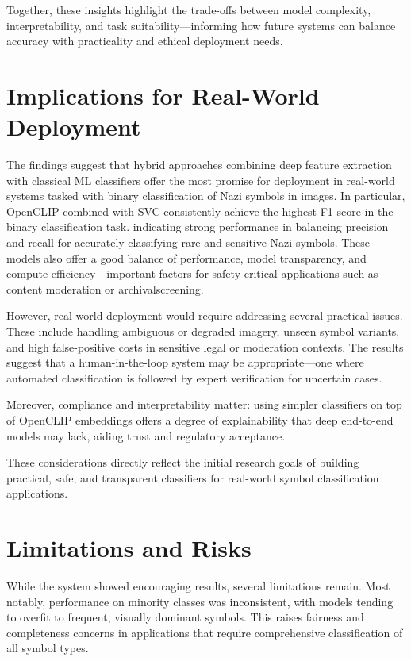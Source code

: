 Together, these insights highlight the trade-offs between model complexity, interpretability, and task
suitability—informing how future systems can balance accuracy with practicality and ethical deployment needs.

\section{Implications for Real-World Deployment}
\label{subsec:deployment-implications}

The findings suggest that hybrid approaches combining deep feature extraction with classical \ac{ML}
classifiers offer the most promise for deployment in real-world systems tasked with binary classification of Nazi
symbols in images. In particular, OpenCLIP combined with \ac{SVC} consistently achieve the highest F1-score in the
binary classification task. indicating strong performance in balancing precision and recall for accurately
classifying rare and sensitive Nazi symbols. These models also offer a good balance of performance, model
transparency, and compute efficiency—important factors for safety-critical applications such as content moderation
or archivalscreening.

However, real-world deployment would require addressing several practical issues. These include handling ambiguous
or degraded imagery, unseen symbol variants, and high false-positive costs in sensitive legal or moderation
contexts. The results suggest that a human-in-the-loop system may be appropriate—one where automated classification
is followed by expert verification for uncertain cases.

Moreover, compliance and interpretability matter: using simpler classifiers on top of OpenCLIP embeddings offers a
degree of explainability that deep end-to-end models may lack, aiding trust and regulatory acceptance.

These considerations directly reflect the initial research goals of building practical, safe, and transparent
classifiers for real-world symbol classification applications.

\section{Limitations and Risks}
\label{subsec:limitations}

While the system showed encouraging results, several limitations remain. Most notably, performance on minority
classes was inconsistent, with models tending to overfit to frequent, visually dominant symbols. This raises
fairness and completeness concerns in applications that require comprehensive classification of all symbol types.


